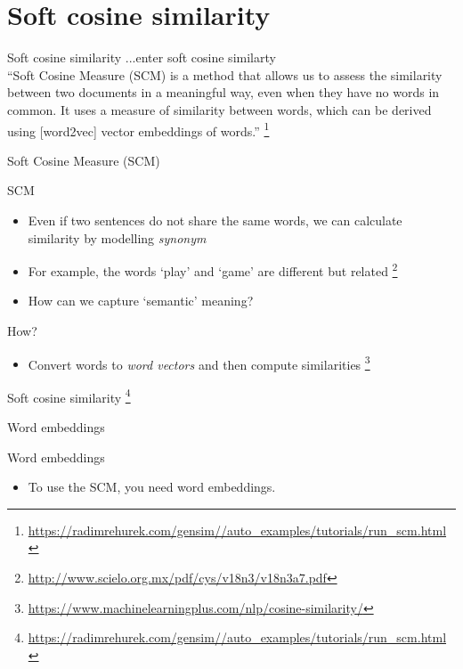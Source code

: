 \section{Soft cosine similarity}

\begin{frame}{Soft cosine similarity}
	\huge{...enter soft cosine similarty} \textcite{Sidorov2014}\\
	\pause
	\footnotesize{``Soft Cosine Measure (SCM) is a method that allows us to assess the similarity between two documents in a meaningful way, even when they have no words in common. It uses a measure of similarity between words, which can be derived using [word2vec] vector embeddings of words.''}
	\footnote{\url{https://radimrehurek.com/gensim//auto_examples/tutorials/run_scm.html}}
\end{frame}

\begin{frame}{Soft Cosine Measure (SCM)}
	\begin{block}{SCM}
		\begin{itemize}
			\item <1-> Even if two sentences do not share the same words, we can calculate similarity by modelling \emph{synonym}
			\item <2->For example, the words `play' and `game' are different but related \textcite{Sidorov2014} \footnote{\url{http://www.scielo.org.mx/pdf/cys/v18n3/v18n3a7.pdf}}
			\item<3->How can we capture `semantic' meaning?
		\end{itemize}
	\end{block}
	\begin{exampleblock}{How?}
		\begin{itemize}
			\item <4-> Convert words to \emph{word vectors} and then compute similarities  \footnote{\url{https://www.machinelearningplus.com/nlp/cosine-similarity/}}
		\end{itemize}
	\end{exampleblock}
\end{frame}


\begin{frame}
	Soft cosine similarity \footnote{\url{https://radimrehurek.com/gensim//auto_examples/tutorials/run_scm.html}}
\end{frame}

\begin{frame}{Word embeddings}
	\begin{block}{Word embeddings}
		\begin{itemize}
			\item <1->To use the SCM, you need word embeddings. 
		\end{itemize}
	\end{block}
\end{frame}

